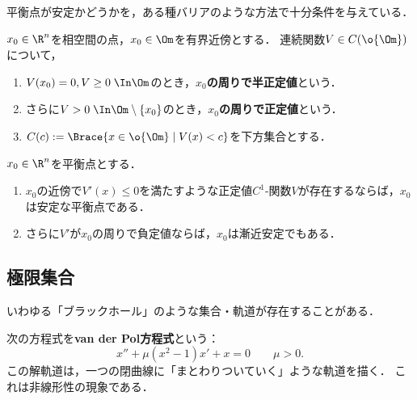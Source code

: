 \documentclass[uplatex,dvipdfmx]{jsreport}
\begin{document}
\begin{tcolorbox}[colframe=ForestGreen, colback=ForestGreen!10!white,breakable,colbacktitle=ForestGreen!40!white,coltitle=black,fonttitle=\bfseries\sffamily,
title=]
    平衡点が安定かどうかを，ある種バリアのような方法で十分条件を与えている．
\end{tcolorbox}

\begin{definition}
    $x_0\in\R^n$を相空間の点，$x_0\in\Om$を有界近傍とする．
    連続関数$V\in C(\o{\Om})$について，
    \begin{enumerate}
        \item $V(x_0)=0,V\ge0\;\In\Om$のとき，\textbf{$x_0$の周りで半正定値}という．
        \item さらに$V>0\;\In\Om\setminus\{x_0\}$のとき，\textbf{$x_0$の周りで正定値}という．
        \item $C(c):=\Brace{x\in\o{\Om}\mid V(x)<c}$を下方集合とする．
    \end{enumerate}
\end{definition}

\begin{theorem}[Liapunov]
    $x_0\in\R^n$を平衡点とする．
    \begin{enumerate}
        \item $x_0$の近傍で$V'(x)\le0$を満たすような正定値$C^1$-関数$V$が存在するならば，$x_0$は安定な平衡点である．
        \item さらに$V'$が$x_0$の周りで負定値ならば，$x_0$は漸近安定でもある．
    \end{enumerate}
\end{theorem}

\subsection{極限集合}

\begin{tcolorbox}[colframe=ForestGreen, colback=ForestGreen!10!white,breakable,colbacktitle=ForestGreen!40!white,coltitle=black,fonttitle=\bfseries\sffamily,
title=]
    いわゆる「ブラックホール」のような集合・軌道が存在することがある．
\end{tcolorbox}

\begin{example}
    次の方程式を\textbf{van der Pol方程式}という：\[x''+\mu(x^2-1)x'+x=0\qquad\mu>0.\]
    この解軌道は，一つの閉曲線に「まとわりついていく」ような軌道を描く．
    これは非線形性の現象である．
\end{example}
\end{document}
